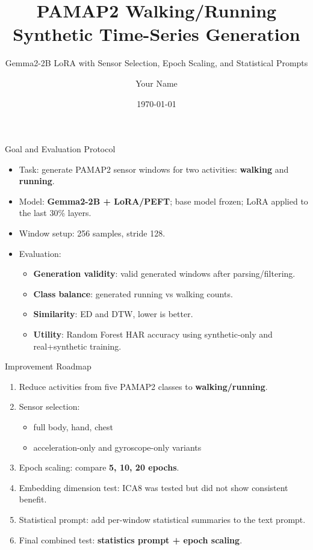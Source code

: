 \documentclass[aspectratio=169,11pt]{ctexbeamer}
\title[PAMAP2 Synthetic Generation]{PAMAP2 Walking/Running Synthetic Time-Series Generation}
\subtitle{Gemma2-2B LoRA with Sensor Selection, Epoch Scaling, and Statistical Prompts}
\author{Your Name}
\institute{Aalto University}
\date{\today}
\begin{document}
\begin{frame}
  \titlepage
\end{frame}

\begin{frame}{Goal and Evaluation Protocol}
\begin{itemize}
  \item Task: generate PAMAP2 sensor windows for two activities: \textbf{walking} and \textbf{running}.
  \item Model: \textbf{Gemma2-2B + LoRA/PEFT}; base model frozen; LoRA applied to the last 30\% layers.
  \item Window setup: 256 samples, stride 128.
  \item Evaluation:
  \begin{itemize}
    \item \textbf{Generation validity}: valid generated windows after parsing/filtering.
    \item \textbf{Class balance}: generated running vs walking counts.
    \item \textbf{Similarity}: ED and DTW, lower is better.
    \item \textbf{Utility}: Random Forest HAR accuracy using synthetic-only and real+synthetic training.
  \end{itemize}
\end{itemize}
\end{frame}

\begin{frame}{Improvement Roadmap}
\begin{enumerate}
  \item Reduce activities from five PAMAP2 classes to \textbf{walking/running}.
  \item Sensor selection:
  \begin{itemize}
    \item full body, hand, chest
    \item acceleration-only and gyroscope-only variants
  \end{itemize}
  \item Epoch scaling: compare \textbf{5, 10, 20 epochs}.
  \item Embedding dimension test: ICA8 was tested but did not show consistent benefit.
  \item Statistical prompt: add per-window statistical summaries to the text prompt.
  \item Final combined test: \textbf{statistics prompt + epoch scaling}.
\end{enumerate}
\end{frame}
\end{document}
